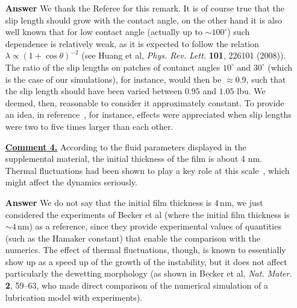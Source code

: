 \documentclass[12pt,english]{article}
\begin{document}
\begin{itemize}
\item[ \textbf{{Answer}}]
{
We thank the Referee for this remark. It is of course true that the slip length 
should grow with the contact angle, on the other hand it is also well known that for low contact angle (actually up to $\sim 100^{\circ}$) such dependence is relatively weak, 
as it is expected to follow the relation $\lambda \propto (1+\cos \theta)^{-2}$
(see Huang et al, {\it Phys. Rev. Lett.} {\bf 101}, 226101 (2008)). The ratio 
of the slip lengths on patches of contanct angles $10^{\circ}$ and $30^{\circ}$
(which is the case of our simulations), for instance, would then be $\approx 0.9$,
such that the slip length should have been varied between $0.95$ and $1.05$ lbu. We deemed, then, reasonable to consider it approximately constant. 
To provide an idea, in reference~\cite{zhang_sprittles_lockerby_2021}, for instance, effects were appreciated 
when slip lengths were two to five times larger than each other. 
}

\item[ \textbf{\underline{Comment 4.}}]
{ 
According to the fluid parameters displayed in the supplemental material, the initial thickness of the film is about 4 nm. 
Thermal fluctuations had been shown to play a key role at this scale~\cite{PhysRevLett.99.114503, PhysRevLett.126.228004}, which might affect the dynamics seriously.
}

\item[ \textbf{{Answer}}]
{
We do not say that the initial film thickness is $4 \, \text{nm}$, we just considered the experiments of Becker et al (where the initial film thickness is $\sim 4 \, \text{nm}$) as a reference, since they provide experimental values of quantities (such as the Hamaker constant) that enable the comparison 
with the numerics. The effect of thermal fluctuations, though, is known to essentially show up as 
a speed up of the growth of the instability, but it does not affect particularly the dewetting morphology (as shown in Becker et al, {\it Nat. Mater.} {\bf 2}, 59--63, who made direct comparison 
of the numerical simulation of a lubrication model with experiments).
}


\end{itemize}




\end{document}
